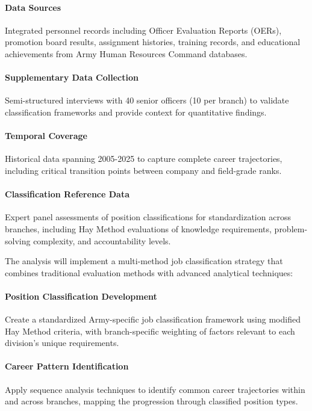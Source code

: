\documentclass[../main.tex]{subfiles}
\begin{document}
\paragraph{Data Sources} Integrated personnel records including Officer Evaluation Reports (OERs), promotion board results, assignment histories, training records, and educational achievements from Army Human Resources Command databases.

\paragraph{Supplementary Data Collection} Semi-structured interviews with 40 senior officers (10 per branch) to validate classification frameworks and provide context for quantitative findings.

\paragraph{Temporal Coverage} Historical data spanning 2005-2025 to capture complete career trajectories, including critical transition points between company and field-grade ranks.

\paragraph{Classification Reference Data} Expert panel assessments of position classifications for standardization across branches, including Hay Method evaluations of knowledge requirements, problem-solving complexity, and accountability levels.

The analysis will implement a multi-method job classification strategy that combines traditional evaluation methods with advanced analytical techniques:

\paragraph{Position Classification Development} Create a standardized Army-specific job classification framework using modified Hay Method criteria, with branch-specific weighting of factors relevant to each division's unique requirements.

\paragraph{Career Pattern Identification} Apply sequence analysis techniques to identify common career trajectories within and across branches, mapping the progression through classified position types.
\end{document}
